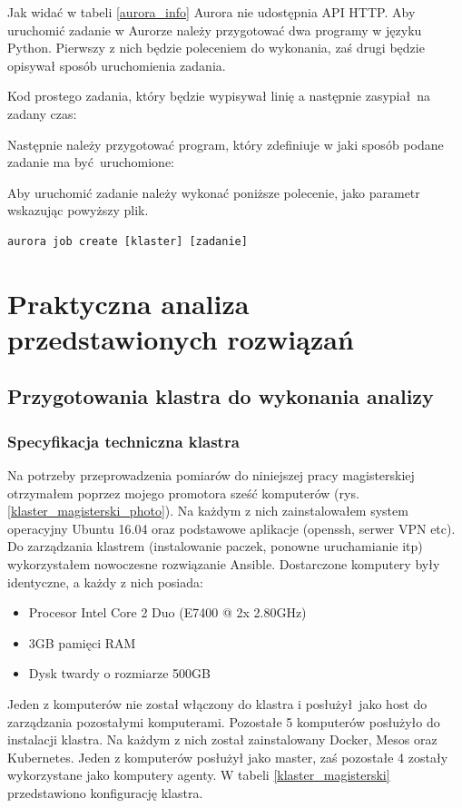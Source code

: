 \documentclass[10pt,a4paper,titlepage,twoside]{report}
\begin{document}
Jak widać w tabeli \ref{aurora_info} Aurora nie udostępnia API HTTP. Aby uruchomić zadanie w Aurorze należy przygotować dwa programy w języku Python. Pierwszy z nich będzie poleceniem do wykonania, zaś drugi będzie opisywał sposób uruchomienia zadania.

Kod prostego zadania, który będzie wypisywał linię a następnie zasypiał na zadany czas:


Następnie należy przygotować program, który zdefiniuje w jaki sposób podane zadanie ma być uruchomione:


Aby uruchomić zadanie należy wykonać poniższe polecenie, jako parametr wskazując powyższy plik.
\begin{lstlisting}
aurora job create [klaster] [zadanie]
\end{lstlisting}

\onehalfspacing
\chapter{Praktyczna analiza przedstawionych rozwiązań}
\section{Przygotowania klastra do wykonania analizy}
\subsection{Specyfikacja techniczna klastra}
Na potrzeby przeprowadzenia pomiarów do niniejszej pracy magisterskiej otrzymałem poprzez mojego promotora sześć komputerów (rys. \ref{klaster_magisterski_photo}). Na każdym z nich zainstalowałem system operacyjny Ubuntu 16.04 oraz podstawowe aplikacje (openssh, serwer VPN etc). Do zarządzania klastrem (instalowanie paczek, ponowne uruchamianie itp) wykorzystałem nowoczesne rozwiązanie Ansible. Dostarczone komputery były identyczne, a każdy z nich posiada:
\begin{itemize}
\item Procesor Intel Core 2 Duo (E7400 @ 2x 2.80GHz)
\item 3GB pamięci RAM
\item Dysk twardy o rozmiarze 500GB
\end{itemize}

Jeden z komputerów nie został włączony do klastra i posłużył jako host do zarządzania pozostałymi komputerami. Pozostałe 5 komputerów posłużyło do instalacji klastra. Na każdym z nich został zainstalowany Docker, Mesos oraz Kubernetes. Jeden z komputerów posłużył jako master, zaś pozostałe 4 zostały wykorzystane jako komputery agenty. W tabeli \ref{klaster_magisterski} przedstawiono konfigurację klastra.
\end{document}
